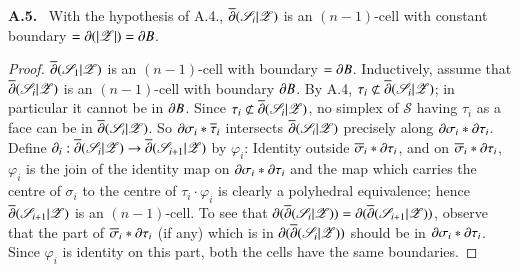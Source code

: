 \medskip
\noindent
{\bf A.5.}~ With the hypothesis of A.4., $\overline{\partial}(\mathscr{S}_{i}|\mathscr{Z})$ is an $(n-1)$-cell with constant boundary $=\partial (|\mathscr{Z}|)=\partial B$.

\begin{proof}
$\overline{\partial}(\mathscr{S}_{1}|\mathscr{Z})$ is an $(n-1)$-cell with boundary $=\partial B$. Inductively, assume that $\overline{\partial}(\mathscr{S}_{i}|\mathscr{Z})$ is an $(n-1)$-cell with boundary $\partial B$. By A.4, $\tau_{i}\not\subset \overline{\partial}(\mathscr{S}_{i}|\mathscr{Z})$; in particular it cannot be in $\partial B$. Since $\tau_{i}\not\subset \overline{\partial}(\mathscr{S}_{i}|\mathscr{Z})$, no simplex of $\mathscr{S}$ having $\tau_{i}$ as a face can be in $\overline{\partial}(\mathscr{S}_{i}|\mathscr{Z})$. So $\partial \sigma_{i}\ast \overline{\tau}_{i}$ intersects $\overline{\partial}(\mathscr{S}_{i}|\mathscr{Z})$ precisely along $\partial \sigma_{i}\ast \partial \tau_{i}$. Define $\partial_{i}:\overline{\partial}(\mathscr{S}_{i}|\mathscr{Z})\to \overline{\partial}(\mathscr{S}_{i+1}|\mathscr{Z})$ by $\varphi_{i}$: Identity outside $\overline{\sigma}_{i}\ast \partial \tau_{i}$, and on $\overline{\sigma}_{i}\ast \partial \tau_{i}$, $\varphi_{i}$ is the join of the identity map on 
$\partial \sigma_{i}\ast \partial \tau_{i}$ and the map which carries the centre of $\sigma_{i}$ to the centre of $\tau_{i}\cdot \varphi_{i}$ is clearly a polyhedral equivalence; hence $\overline{\partial}(\mathscr{S}_{i+1}|\mathscr{Z})$ is an $(n-1)$-cell. To see that $\partial(\overline{\partial}(\mathscr{S}_{i}|\mathscr{Z}))=\partial (\overline{\partial}(\mathscr{S}_{i+1}|\mathscr{Z}))$, observe that the part of $\overline{\sigma}_{i}\ast\partial\tau_{i}$ (if any) which is in $\partial(\overline{\partial}(\mathscr{S}_{i}|\mathscr{Z}))$ should be in $\partial \sigma_{i}\ast \partial \tau_{i}$. Since $\varphi_{i}$ is identity on this part, both the cells have the same boundaries.
\end{proof}



